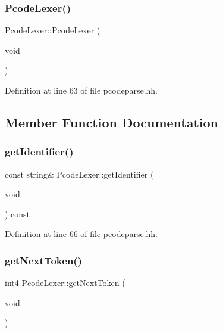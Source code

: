 \subsubsection{\texorpdfstring{PcodeLexer()}{PcodeLexer()}}
{\footnotesize\ttfamily Pcode\+Lexer\+::\+Pcode\+Lexer (\begin{DoxyParamCaption}\item[{void}]{ }\end{DoxyParamCaption})\hspace{0.3cm}{\ttfamily [inline]}}



Definition at line 63 of file pcodeparse.\+hh.



\subsection{Member Function Documentation}
\mbox{\label{class_pcode_lexer_a07f31b29b86205a4536fdc4e1ac22194}} 
\subsubsection{\texorpdfstring{getIdentifier()}{getIdentifier()}}
{\footnotesize\ttfamily const string\& Pcode\+Lexer\+::get\+Identifier (\begin{DoxyParamCaption}\item[{void}]{ }\end{DoxyParamCaption}) const\hspace{0.3cm}{\ttfamily [inline]}}



Definition at line 66 of file pcodeparse.\+hh.

\mbox{\label{class_pcode_lexer_a0a7d18fad0500a7c54502cac6c84b9f8}} 
\subsubsection{\texorpdfstring{getNextToken()}{getNextToken()}}
{\footnotesize\ttfamily int4 Pcode\+Lexer\+::get\+Next\+Token (\begin{DoxyParamCaption}\item[{void}]{ }\end{DoxyParamCaption})}


